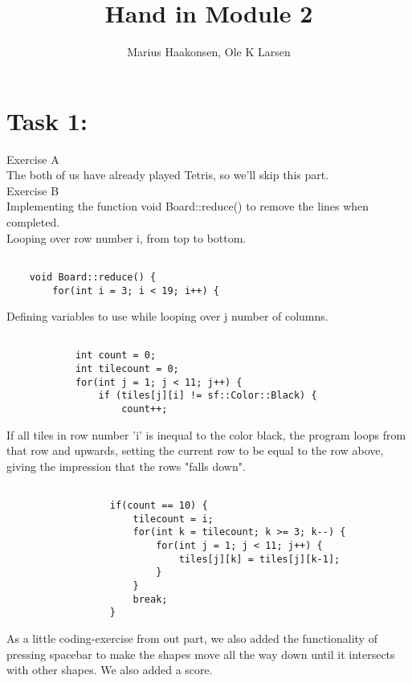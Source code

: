 \documentclass[11pt]{amsart}
\title{Hand in Module 2}
\author{Marius Haakonsen, Ole K Larsen}
\begin{document}
\maketitle

\section{Task 1:}

Exercise A  \\
The both of us have already played Tetris, so we'll skip this part.  \\

Exercise B \\

Implementing the function void Board::reduce() to remove the lines when completed. \\

Looping over row number i, from top to bottom. \\
\begin{verbatim}

	void Board::reduce() {
	    for(int i = 3; i < 19; i++) {

\end{verbatim}

Defining variables to use while looping over j number of columns. \\
\begin{verbatim}

	        int count = 0;
	        int tilecount = 0;
	        for(int j = 1; j < 11; j++) {
	            if (tiles[j][i] != sf::Color::Black) {
	                count++;

\end{verbatim}

If all tiles in row number 'i' is inequal to the color black, the program loops from that
row and upwards, setting the current row to be equal to the row above, giving the impression that the rows "falls down". \\
\begin{verbatim}

	              if(count == 10) {
	                  tilecount = i;
	                  for(int k = tilecount; k >= 3; k--) {
	                      for(int j = 1; j < 11; j++) {
	                          tiles[j][k] = tiles[j][k-1];
	                      }
	                  }
	                  break;
	              }
\end{verbatim}

As a little coding-exercise from out part, we also added the functionality of pressing spacebar to make the shapes move all the way down until it intersects with other shapes. We also added a score.
\end{document}
